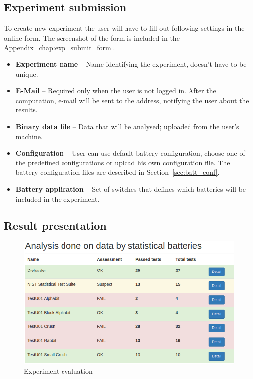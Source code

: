 \documentclass[
	digital,    %
	oneside,    %
	color,
	11pt,
	nocover,
	notable,
	nolof,
	nolot,
]{fithesis3}
\theoremstyle{definition}
\theoremstyle{remark}
\begin{document}
\subsection*{Experiment submission}
To create new experiment the user  will have to fill-out following settings in the online form. The screenshot of the form is included in the Appendix~\ref{chap:exp_submit_form}.

\begin{itemize}
\item \textbf{Experiment name} -- Name identifying the experiment, doesn't have to be unique.
\item \textbf{E-Mail} -- Required only when the user is not logged in. After the computation, e-mail will be sent to the address, notifying the user about the results.
\item \textbf{Binary data file} -- Data that will be analysed; uploaded from the user's machine.
\item \textbf{Configuration} -- User can use default battery configuration, choose one of the predefined configurations or upload his own configuration file. The battery configuration files are described in Section~\ref{sec:batt_conf}.
\item \textbf{Battery application} -- Set of switches that defines which batteries will be included in the experiment.
\end{itemize}

\subsection*{Result presentation}
\begin{figure}[H]
\begin{nomar}
\centering
\includegraphics[width=\textwidth]{figures/rtt-assessment.png} 
\end{nomar}
\caption{Experiment evaluation}
\label{fig:rtt_assessment}
\end{figure}
\end{document}
